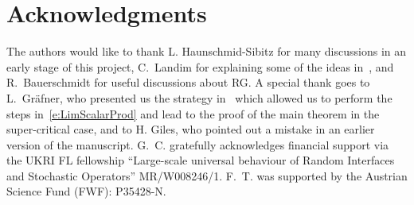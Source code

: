 \documentclass[reqno,11pt]{preprint}
\newcommand{\J}{\mathbb{J}}
\newcommand{\cA}{\mathcal{A}}
\newcommand{\cF}{\mathcal{F}}
\newcommand{\cN}{\mathcal{N}}
\newcommand{\1}{\mathds{1}}
\def\indN#1{{	\J^\eps_{#1}	}}
\newcommand{\fock}{\Gamma L^2}	%
\newcommand{\gena}{\cA^{\eps}}
\newcommand{\NN}{\cN^\eps}
\begin{document}
%
%
%
%
%

\section*{Acknowledgments} 
The authors would like to thank L. Haunschmid-Sibitz for many
discussions in an early stage of this project, C.~Landim for
explaining some of the ideas in~\cite{Komorowski2012}, and R.~Bauerschmidt for useful discussions about RG.  A
special thank goes to L.~Gr\"afner, who presented us the strategy
in~\cite{GrPer} which allowed us to perform the steps
in~\eqref{e:LimScalarProd} and lead to the proof of the main theorem in the
super-critical case, and to H. Giles, who pointed out a mistake in an earlier version of the manuscript. 
G.~C. gratefully acknowledges financial support
via the UKRI FL fellowship ``Large-scale universal behaviour of Random
Interfaces and Stochastic Operators'' MR/W008246/1.  F.~T.  was
supported by the Austrian Science Fund (FWF): P35428-N.



\end{document}
